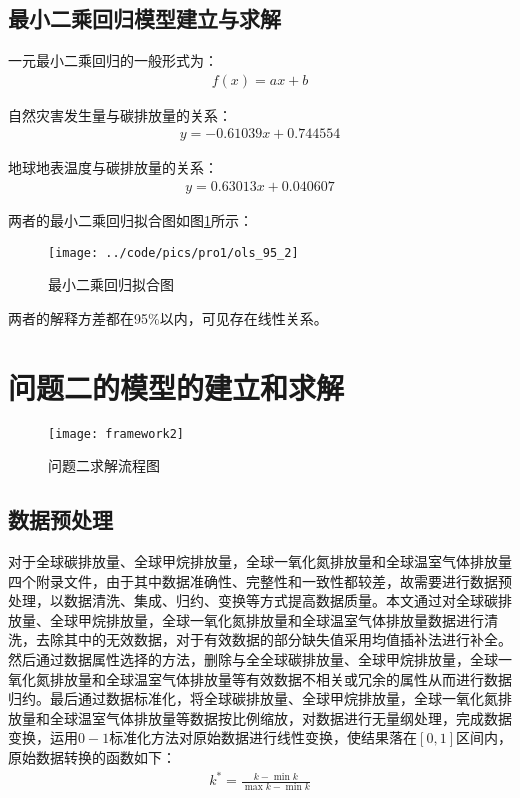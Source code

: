 \documentclass[withoutpreface,bwprint]{cumcmthesis}
\begin{document}
\subsection{最小二乘回归模型建立与求解}
一元最小二乘回归的一般形式为：
\begin{align*}
	f(x) = ax +b
\end{align*}

自然灾害发生量与碳排放量的关系：
	\begin{align*}
		 y = -0.61039 x + 0.744554
	\end{align*}

地球地表温度与碳排放量的关系：
	\begin{align*}
 		y = 0.63013 x + 0.040607
	\end{align*}

两者的最小二乘回归拟合图如图\ref{fig:ols952}所示：

\begin{figure}[h]
	\centering
	\texttt{[image: ../code/pics/pro1/ols\_95\_2]}
	\caption{最小二乘回归拟合图}
	\label{fig:ols952}
\end{figure}


两者的解释方差都在95\%以内，可见存在线性关系。


\section{问题二的模型的建立和求解}

\begin{figure}[htbp]
	\centering
	\texttt{[image: framework2]}
	\caption{问题二求解流程图}
	\label{fig:framework2}
\end{figure}


\subsection{数据预处理}
    对于全球碳排放量、全球甲烷排放量，全球一氧化氮排放量和全球温室气体排放量四个附录文件，由于其中数据准确性、完整性和一致性都较差，故需要进行数据预处理，以数据清洗、集成、归约、变换等方式提高数据质量。本文通过对全球碳排放量、全球甲烷排放量，全球一氧化氮排放量和全球温室气体排放量数据进行清洗，去除其中的无效数据，对于有效数据的部分缺失值采用均值插补法进行补全。然后通过数据属性选择的方法，删除与全全球碳排放量、全球甲烷排放量，全球一氧化氮排放量和全球温室气体排放量等有效数据不相关或冗余的属性从而进行数据归约。最后通过数据标准化，将全球碳排放量、全球甲烷排放量，全球一氧化氮排放量和全球温室气体排放量等数据按比例缩放，对数据进行无量纲处理，完成数据变换，运用$0-1$标准化方法对原始数据进行线性变换，使结果落在$[0,1]$区间内，原始数据转换的函数如下：
    \begin{align*}
    	{{k}^{*}}=\frac{k-\min{k}}{\max{k}-\min{k}}
    \end{align*}
\end{document}
